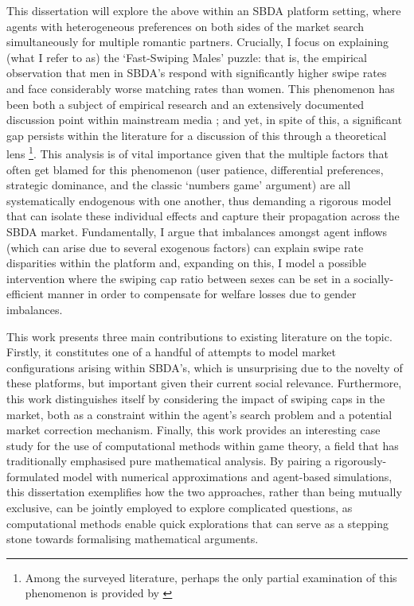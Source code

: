 This dissertation will explore the above within an SBDA platform setting, where agents with heterogeneous preferences on both sides of the market search simultaneously for multiple romantic partners.
Crucially, I focus on explaining (what I refer to as) the `Fast-Swiping Males' puzzle: that is, the empirical observation that men in SBDA's respond with significantly higher swipe rates and face considerably worse matching rates than women. This phenomenon has been both a subject of empirical research \citep{tyson2016first} and an extensively documented discussion point within mainstream media \citep{web:vice_tindermen, web:wp_miserabletinder}; and yet, in spite of this, a significant gap persists within the literature for a discussion of this through a theoretical lens \footnote{Among the surveyed literature, perhaps the only partial examination of this phenomenon is provided by \cite{kanoria2021facilitating}}. 
This analysis is of vital importance given that the multiple factors that often get blamed for this phenomenon (user patience, differential preferences, strategic dominance, and the classic `numbers game' argument) are all systematically endogenous with one another, thus demanding a rigorous model that can isolate these individual effects and capture their propagation across the SBDA market.
Fundamentally, I argue that imbalances amongst agent inflows (which can arise due to several exogenous factors) can explain swipe rate disparities within the platform and, expanding on this, I model a possible intervention where the swiping cap ratio between sexes can be set in a socially-efficient manner in order to compensate for welfare losses due to gender imbalances.

This work presents three main contributions to existing literature on the topic. 
Firstly, it constitutes one of a handful of attempts to model market configurations arising within SBDA's, which is unsurprising due to the novelty of these platforms, but important given their current social relevance. 
Furthermore, this work distinguishes itself by considering the impact of swiping caps in the market, both as a constraint within the agent's search problem and a potential market correction mechanism.
Finally, this work provides an interesting case study for the use of computational methods within game theory, a field that has traditionally emphasised pure mathematical analysis. 
By pairing a rigorously-formulated model with numerical approximations and agent-based simulations, this dissertation exemplifies how the two approaches, rather than being mutually exclusive, can be jointly employed to explore complicated questions, as computational methods enable quick explorations that can serve as a stepping stone towards formalising mathematical arguments.

